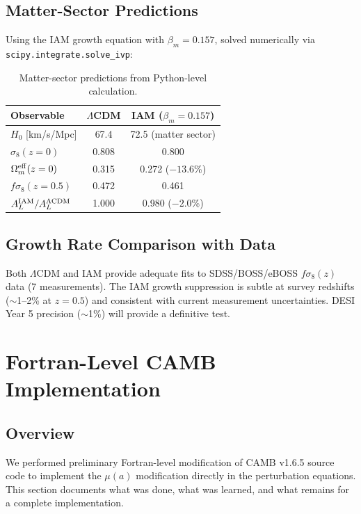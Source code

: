 \documentclass[11pt,letterpaper]{article}
\begin{document}
\subsection{Matter-Sector Predictions}

Using the IAM growth equation with $\beta_m = 0.157$, solved numerically via \texttt{scipy.integrate.solve\_ivp}:

\begin{table}[h]
\centering
\begin{tabular}{lcc}
\toprule
Observable & $\Lambda$CDM & IAM ($\beta_m = 0.157$) \\
\midrule
$H_0$ [km/s/Mpc] & 67.4 & 72.5 (matter sector) \\
$\sigma_8(z=0)$ & 0.808 & 0.800 \\
$\Omega_m^{\rm eff}(z=0)$ & 0.315 & 0.272 ($-13.6$\%) \\
$f\sigma_8(z=0.5)$ & 0.472 & 0.461 \\
$A_L^{\rm IAM}/A_L^{\Lambda\rm CDM}$ & 1.000 & 0.980 ($-2.0$\%) \\
\bottomrule
\end{tabular}
\caption{Matter-sector predictions from Python-level calculation.}
\end{table}

\subsection{Growth Rate Comparison with Data}

Both $\Lambda$CDM and IAM provide adequate fits to SDSS/BOSS/eBOSS $f\sigma_8(z)$ data (7 measurements). The IAM growth suppression is subtle at survey redshifts ($\sim$1--2\% at $z = 0.5$) and consistent with current measurement uncertainties. DESI Year 5 precision ($\sim$1\%) will provide a definitive test.

\section{Fortran-Level CAMB Implementation}
\label{sec:fortran}

\subsection{Overview}

We performed preliminary Fortran-level modification of CAMB v1.6.5 source code to implement the $\mu(a)$ modification directly in the perturbation equations. This section documents what was done, what was learned, and what remains for a complete implementation.
\end{document}
